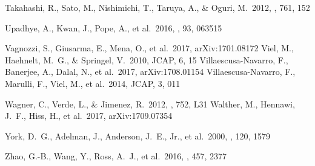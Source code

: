 \documentclass{emulateapj}
\begin{document}
\begin{thebibliography}{}
 Takahashi, R., Sato, M., Nishimichi, T., Taruya, A., \& Oguri, M.\ 2012, \apj, 761, 152 

 Upadhye, A., Kwan, J., Pope, A., et al.\ 2016, \prd, 93, 063515


 Vagnozzi, S., Giusarma, E., Mena, O., et al.\ 2017, arXiv:1701.08172 
 Viel, M., Haehnelt, M.~G., \& Springel, V.\ 2010, JCAP, 6, 15 
 Villaescusa-Navarro, F., Banerjee, A., Dalal, N., et al.\ 2017, arXiv:1708.01154 
 Villaescusa-Navarro, F., Marulli, F., Viel, M., et al.\ 2014, JCAP, 3, 011 

 
 Wagner, C., Verde, L., \& Jimenez, R.\ 2012, \apjl, 752, L31 
 Walther, M., Hennawi, J.~F., Hiss, H., et al.\ 2017, arXiv:1709.07354 


 York, D.~G., Adelman, J., Anderson, J.~E., Jr., et al.\ 2000, \aj, 120, 1579 



 Zhao, G.-B., Wang, Y., Ross, A.~J., et al.\ 2016, \mnras, 457, 2377
 
 
\end{thebibliography}

\end{document}
